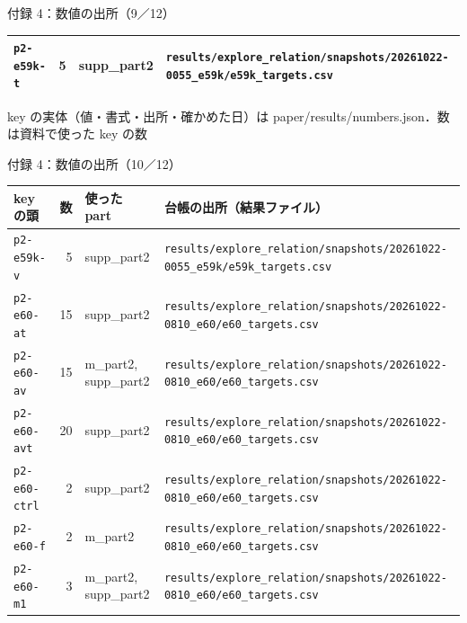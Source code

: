 \begin{frame}{付録 4：数値の出所（9／12）}
\begin{tabularx}{\textwidth}{@{}l r l X@{}}
    \texttt{p2-e59k-t} & 5 & supp\_part2 & \texttt{results/\allowbreak{}explore\_\allowbreak{}relation/\allowbreak{}snapshots/\allowbreak{}20261022-0055\_\allowbreak{}e59k/\allowbreak{}e59k\_\allowbreak{}targets.csv} \\
    \bottomrule
  \end{tabularx}\par
  {\raggedright\tiny key の実体（値・書式・出所・確かめた日）は paper/results/numbers.json．数は資料で使った key の数\par}
\end{frame}
\begin{frame}{付録 4：数値の出所（10／12）}
  \vspace{-0.3em}\centering\tiny\renewcommand{\arraystretch}{1.0}
  \begin{tabularx}{\textwidth}{@{}l r l X@{}}
    \toprule key の頭 & 数 & 使った part & 台帳の出所（結果ファイル） \\ \midrule
    \texttt{p2-e59k-v} & 5 & supp\_part2 & \texttt{results/\allowbreak{}explore\_\allowbreak{}relation/\allowbreak{}snapshots/\allowbreak{}20261022-0055\_\allowbreak{}e59k/\allowbreak{}e59k\_\allowbreak{}targets.csv} \\
    \texttt{p2-e60-at} & 15 & supp\_part2 & \texttt{results/\allowbreak{}explore\_\allowbreak{}relation/\allowbreak{}snapshots/\allowbreak{}20261022-0810\_\allowbreak{}e60/\allowbreak{}e60\_\allowbreak{}targets.csv} \\
    \texttt{p2-e60-av} & 15 & m\_part2, supp\_part2 & \texttt{results/\allowbreak{}explore\_\allowbreak{}relation/\allowbreak{}snapshots/\allowbreak{}20261022-0810\_\allowbreak{}e60/\allowbreak{}e60\_\allowbreak{}targets.csv} \\
    \texttt{p2-e60-avt} & 20 & supp\_part2 & \texttt{results/\allowbreak{}explore\_\allowbreak{}relation/\allowbreak{}snapshots/\allowbreak{}20261022-0810\_\allowbreak{}e60/\allowbreak{}e60\_\allowbreak{}targets.csv} \\
    \texttt{p2-e60-ctrl} & 2 & supp\_part2 & \texttt{results/\allowbreak{}explore\_\allowbreak{}relation/\allowbreak{}snapshots/\allowbreak{}20261022-0810\_\allowbreak{}e60/\allowbreak{}e60\_\allowbreak{}targets.csv} \\
    \texttt{p2-e60-f} & 2 & m\_part2 & \texttt{results/\allowbreak{}explore\_\allowbreak{}relation/\allowbreak{}snapshots/\allowbreak{}20261022-0810\_\allowbreak{}e60/\allowbreak{}e60\_\allowbreak{}targets.csv} \\
    \texttt{p2-e60-m1} & 3 & m\_part2, supp\_part2 & \texttt{results/\allowbreak{}explore\_\allowbreak{}relation/\allowbreak{}snapshots/\allowbreak{}20261022-0810\_\allowbreak{}e60/\allowbreak{}e60\_\allowbreak{}targets.csv} \\

\end{tabularx}
\end{frame}
